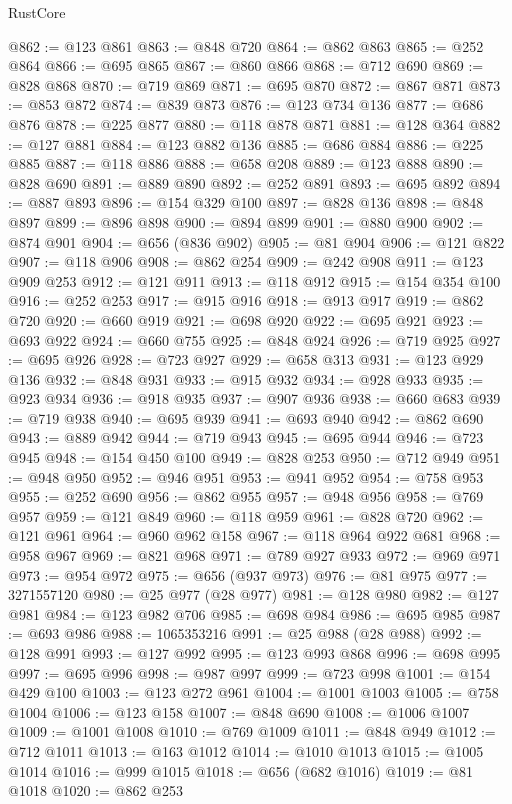 \begin{lexlean}{RustCore}
\begin{coremodule}
@862 := @123 @861
@863 := @848 @720
@864 := @862 @863
@865 := @252 @864
@866 := @695 @865
@867 := @860 @866
@868 := @712 @690
@869 := @828 @868
@870 := @719 @869
@871 := @695 @870
@872 := @867 @871
@873 := @853 @872
@874 := @839 @873
@876 := @123 @734 @136
@877 := @686 @876
@878 := @225 @877
@880 := @118 @878 @871
@881 := @128 @364
@882 := @127 @881
@884 := @123 @882 @136
@885 := @686 @884
@886 := @225 @885
@887 := @118 @886
@888 := @658 @208
@889 := @123 @888
@890 := @828 @690
@891 := @889 @890
@892 := @252 @891
@893 := @695 @892
@894 := @887 @893
@896 := @154 @329 @100
@897 := @828 @136
@898 := @848 @897
@899 := @896 @898
@900 := @894 @899
@901 := @880 @900
@902 := @874 @901
@904 := @656 (@836 @902)
@905 := @81 @904
@906 := @121 @822
@907 := @118 @906
@908 := @862 @254
@909 := @242 @908
@911 := @123 @909 @253
@912 := @121 @911
@913 := @118 @912
@915 := @154 @354 @100
@916 := @252 @253
@917 := @915 @916
@918 := @913 @917
@919 := @862 @720
@920 := @660 @919
@921 := @698 @920
@922 := @695 @921
@923 := @693 @922
@924 := @660 @755
@925 := @848 @924
@926 := @719 @925
@927 := @695 @926
@928 := @723 @927
@929 := @658 @313
@931 := @123 @929 @136
@932 := @848 @931
@933 := @915 @932
@934 := @928 @933
@935 := @923 @934
@936 := @918 @935
@937 := @907 @936
@938 := @660 @683
@939 := @719 @938
@940 := @695 @939
@941 := @693 @940
@942 := @862 @690
@943 := @889 @942
@944 := @719 @943
@945 := @695 @944
@946 := @723 @945
@948 := @154 @450 @100
@949 := @828 @253
@950 := @712 @949
@951 := @948 @950
@952 := @946 @951
@953 := @941 @952
@954 := @758 @953
@955 := @252 @690
@956 := @862 @955
@957 := @948 @956
@958 := @769 @957
@959 := @121 @849
@960 := @118 @959
@961 := @828 @720
@962 := @121 @961
@964 := @960 @962 @158
@967 := @118 @964 @922 @681
@968 := @958 @967
@969 := @821 @968
@971 := @789 @927 @933
@972 := @969 @971
@973 := @954 @972
@975 := @656 (@937 @973)
@976 := @81 @975
@977 := 3271557120
@980 := @25 @977 (@28 @977)
@981 := @128 @980
@982 := @127 @981
@984 := @123 @982 @706
@985 := @698 @984
@986 := @695 @985
@987 := @693 @986
@988 := 1065353216
@991 := @25 @988 (@28 @988)
@992 := @128 @991
@993 := @127 @992
@995 := @123 @993 @868
@996 := @698 @995
@997 := @695 @996
@998 := @987 @997
@999 := @723 @998
@1001 := @154 @429 @100
@1003 := @123 @272 @961
@1004 := @1001 @1003
@1005 := @758 @1004
@1006 := @123 @158
@1007 := @848 @690
@1008 := @1006 @1007
@1009 := @1001 @1008
@1010 := @769 @1009
@1011 := @848 @949
@1012 := @712 @1011
@1013 := @163 @1012
@1014 := @1010 @1013
@1015 := @1005 @1014
@1016 := @999 @1015
@1018 := @656 (@682 @1016)
@1019 := @81 @1018
@1020 := @862 @253

\end{coremodule}
\end{lexlean}
